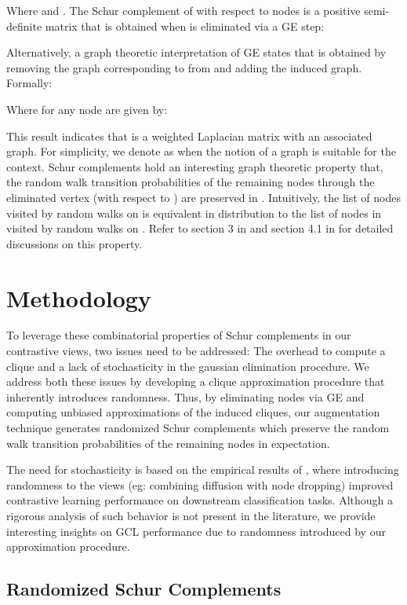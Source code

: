 \documentclass{article}
\theoremstyle{plain}
\theoremstyle{definition}
\theoremstyle{remark}
\begin{document}
Where  and . The Schur complement of  with respect to nodes  is a positive semi-definite matrix that is obtained when  is eliminated via a GE step:

Alternatively, a graph theoretic interpretation of GE states that  is obtained by removing the  graph corresponding to  from  and adding the induced  graph. Formally:

Where  for any node  are given by:


This result indicates that  is a weighted Laplacian matrix with an associated graph. For simplicity, we denote  as  when the notion of a graph is suitable for the context. Schur complements hold an interesting graph theoretic property that, the random walk transition probabilities of the remaining nodes  through the eliminated vertex  (with respect to ) are preserved in . Intuitively, the list of nodes visited by random walks on  is equivalent in distribution to the list of nodes in  visited by random walks on . Refer to section 3 in \citet{durfee2019fully} and section 4.1 in \citet{gao2022fully} for detailed discussions on this property.

\section{Methodology}

To leverage these combinatorial properties of Schur complements in our contrastive views, two issues need to be addressed: The  overhead to compute a clique and a lack of stochasticity in the gaussian elimination procedure. We address both these issues by developing a clique approximation procedure that inherently introduces randomness. Thus, by eliminating nodes via GE and computing unbiased approximations of the induced cliques, our augmentation technique generates randomized Schur complements which preserve the random walk transition probabilities of the remaining nodes in expectation.

The need for stochasticity is based on the empirical results of \citet{zhu2021empirical}, where introducing randomness to the views (eg: combining diffusion with node dropping) improved contrastive learning performance on downstream classification tasks. Although a rigorous analysis of such behavior is not present in the literature, we provide interesting insights on GCL performance due to randomness introduced by our approximation procedure.






\subsection{Randomized Schur Complements}
\end{document}
